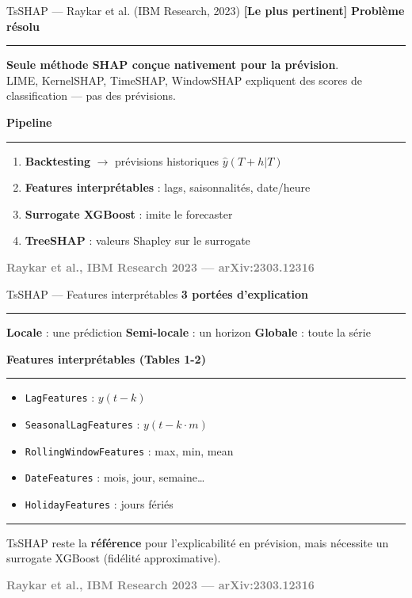 \documentclass[10pt]{beamer}
\newcommand{\source}[1]{\vspace{6pt}\hfill{\textcolor{gray}{\textbf{\tiny #1}}}}
\begin{document}
\begin{frame}{TsSHAP --- Raykar et al. (IBM Research, 2023) \hfill \textcolor{blue!70!black}{\textbf{[Le plus pertinent]}}}
	\textbf{Problème résolu}
	\rule{\linewidth}{0.5pt}
	\vspace{2pt}
	
	\textbf{Seule méthode SHAP conçue nativement pour la prévision}.\\
	LIME, KernelSHAP, TimeSHAP, WindowSHAP expliquent des scores
	de classification --- pas des prévisions.
	
	\vspace{8pt}
	
	\textbf{Pipeline}
	\rule{\linewidth}{0.5pt}
	\vspace{2pt}
	
	\begin{enumerate}
		\item \textbf{Backtesting} $\to$ prévisions historiques $\hat{y}(T+h|T)$
		\item \textbf{Features interprétables} : lags, saisonnalités, date/heure
		\item \textbf{Surrogate XGBoost} : imite le forecaster
		\item \textbf{TreeSHAP} : valeurs Shapley sur le surrogate
	\end{enumerate}
	
	\vspace{4pt}
	\source{Raykar et al., IBM Research 2023 --- arXiv:2303.12316}
\end{frame}

\begin{frame}{TsSHAP --- Features interprétables}
	\textbf{3 portées d'explication}
	\rule{\linewidth}{0.5pt}
	
	\textbf{Locale} : une prédiction \hfill
	\textbf{Semi-locale} : un horizon \hfill
	\textbf{Globale} : toute la série
	
	\vspace{18pt}
	
	\textbf{Features interprétables (Tables 1-2)}
	\rule{\linewidth}{0.5pt}
	
	\begin{itemize}
		\item \texttt{LagFeatures} : $y(t-k)$
		\item \texttt{SeasonalLagFeatures} : $y(t-k \cdot m)$
		\item \texttt{RollingWindowFeatures} : max, min, mean
		\item \texttt{DateFeatures} : mois, jour, semaine\ldots
		\item \texttt{HolidayFeatures} : jours fériés
	\end{itemize}
	
	\vspace{6pt}
	
	\rule{\linewidth}{0.5pt}
	
	\vspace{6pt}
	
	TsSHAP reste la \textbf{référence} pour l'explicabilité en prévision,
	mais nécessite un surrogate XGBoost (fidélité approximative).
	
	\source{Raykar et al., IBM Research 2023 --- arXiv:2303.12316}
\end{frame}
\end{document}

